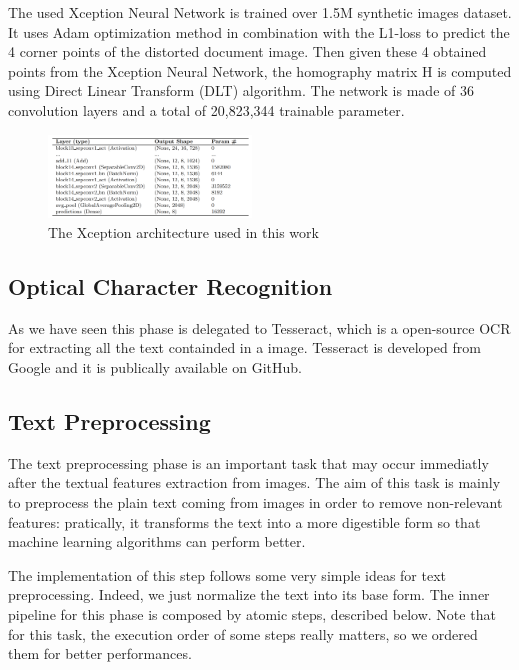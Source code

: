 \documentclass[10pt,twocolumn,letterpaper]{article}
\begin{document}
The used Xception Neural Network is trained over 1.5M synthetic images
dataset. It uses Adam optimization method in combination with the
L1-loss to predict the 4 corner points of the distorted document
image. Then given these 4 obtained points from the Xception Neural
Network, the homography matrix H is computed using Direct Linear
Transform (DLT) algorithm. The network is made of 36 convolution
layers and a total of 20,823,344 trainable parameter.

\begin{figure}[h]
  \centering
  \includegraphics[width=0.48\textwidth]{images/xception-architecture.png}
  \caption{The Xception architecture used in this work}
  \label{fig:xception-architecture}
\end{figure}

\subsection{Optical Character Recognition}

As we have seen this phase is delegated to Tesseract, which is a
open-source OCR for extracting all the text containded in a
image. Tesseract is developed from Google and it is publically
available on GitHub.

\subsection{Text Preprocessing}

The text preprocessing phase is an important task that may occur
immediatly after the textual features extraction from images. The aim
of this task is mainly to preprocess the plain text coming from images
in order to remove non-relevant features: pratically, it transforms the
text into a more digestible form so that machine learning algorithms
can perform better.

The implementation of this step follows some very simple ideas for
text preprocessing. Indeed, we just normalize the text into its base
form. The inner pipeline for this phase is composed by atomic steps,
described below. Note that for this task, the execution order of some
steps really matters, so we ordered them for better performances.
\end{document}
